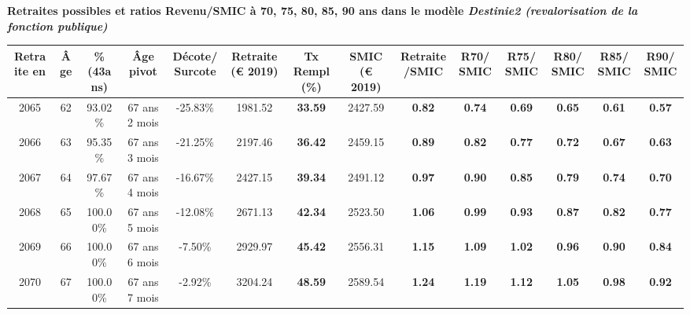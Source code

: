  \vspace{0.1cm} 
{\bf \noindent Retraites possibles et ratios Revenu/SMIC à 70, 75, 80, 85, 90 ans dans le modèle \emph{Destinie2 (revalorisation de la fonction publique)}}  
 
\begin{adjustbox}{max width=\textwidth} 
\begin{tabular}[htb]{|c|c||c|c|c||c|c||c|c||c|c|c|c|c|} 
\hline 
 Retraite en &  Âge &  \%(43ans) &  Âge pivot &  Décote/Surcote &  Retraite (\euro{} 2019) &  Tx Rempl(\%) &  SMIC (\euro{} 2019) &  Retraite/SMIC &  R70/SMIC &  R75/SMIC &  R80/SMIC &  R85/SMIC &  R90/SMIC \\ 
\hline \hline 
 2065 &  62 &  93.02\% &  67 ans 2 mois &  -25.83\% &  1981.52 &  {\bf 33.59} &  2427.59 &  {\bf {\color{red} 0.82}} &  {\bf {\color{red} 0.74}} &  {\bf {\color{red} 0.69}} &  {\bf {\color{red} 0.65}} &  {\bf {\color{red} 0.61}} &  {\bf {\color{red} 0.57}} \\ 
\hline 
 2066 &  63 &  95.35\% &  67 ans 3 mois &  -21.25\% &  2197.46 &  {\bf 36.42} &  2459.15 &  {\bf {\color{red} 0.89}} &  {\bf {\color{red} 0.82}} &  {\bf {\color{red} 0.77}} &  {\bf {\color{red} 0.72}} &  {\bf {\color{red} 0.67}} &  {\bf {\color{red} 0.63}} \\ 
\hline 
 2067 &  64 &  97.67\% &  67 ans 4 mois &  -16.67\% &  2427.15 &  {\bf 39.34} &  2491.12 &  {\bf {\color{red} 0.97}} &  {\bf {\color{red} 0.90}} &  {\bf {\color{red} 0.85}} &  {\bf {\color{red} 0.79}} &  {\bf {\color{red} 0.74}} &  {\bf {\color{red} 0.70}} \\ 
\hline 
 2068 &  65 &  100.00\% &  67 ans 5 mois &  -12.08\% &  2671.13 &  {\bf 42.34} &  2523.50 &  {\bf 1.06} &  {\bf {\color{red} 0.99}} &  {\bf {\color{red} 0.93}} &  {\bf {\color{red} 0.87}} &  {\bf {\color{red} 0.82}} &  {\bf {\color{red} 0.77}} \\ 
\hline 
 2069 &  66 &  100.00\% &  67 ans 6 mois &  -7.50\% &  2929.97 &  {\bf 45.42} &  2556.31 &  {\bf 1.15} &  {\bf 1.09} &  {\bf 1.02} &  {\bf {\color{red} 0.96}} &  {\bf {\color{red} 0.90}} &  {\bf {\color{red} 0.84}} \\ 
\hline 
 2070 &  67 &  100.00\% &  67 ans 7 mois &  -2.92\% &  3204.24 &  {\bf 48.59} &  2589.54 &  {\bf 1.24} &  {\bf 1.19} &  {\bf 1.12} &  {\bf 1.05} &  {\bf {\color{red} 0.98}} &  {\bf {\color{red} 0.92}} \\ 
\hline 
\hline 
\end{tabular} 
\end{adjustbox} 
 
